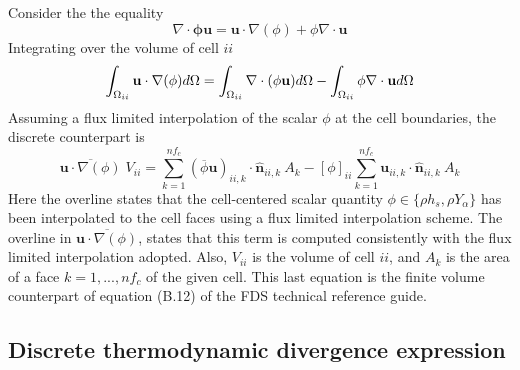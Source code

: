 Consider the the equality
%
\begin{equation}
    \nabla \cdot \mathbf{\phi u} = \mathbf{u} \cdot \nabla (\phi) + \phi \nabla \cdot \mathbf{u} \label{eq:advforms}
\end{equation}
%
Integrating over the volume of cell $ii$
%
\begin{equation}
    \int_{\Omega_{ii}} {\mathbf{u} \cdot \nabla(\phi)} d\Omega =
    \int_{\Omega_{ii}} \nabla \cdot ({\phi} \mathbf{u}) d\Omega -
    \int_{\Omega_{ii}} \phi \nabla \cdot \mathbf{u} d\Omega \label{eq:flxlim1} \\
\end{equation}
Assuming a flux limited interpolation of the scalar $\phi$ at the cell boundaries, the discrete counterpart is
%
\begin{equation}
    \overline{\mathbf{u} \cdot \nabla(\phi)} \; V_{ii} =
    \sum_{k=1}^{nf_c} (\overline{\phi} \mathbf{u})_{ii,k} \cdot \hat{\mathbf{n}}_{ii,k} \: A_k -
    [\phi]_{ii} \sum_{k=1}^{nf_c} \mathbf{u}_{ii,k} \cdot \hat{\mathbf{n}}_{ii,k} \: A_k \label{eq:flxlim2}
\end{equation}
%
Here the overline states that the cell-centered scalar quantity $\phi \in \{\rho h_s, \rho Y_\alpha\}$ has been interpolated to the cell faces using a flux limited interpolation scheme. The overline in $\overline{\mathbf{u} \cdot \nabla(\phi)}$, states that this term is computed consistently with the flux limited interpolation adopted. Also, $V_{ii}$ is the volume of cell $ii$, and $A_k$ is the area of a face $k=1,...,nf_c$ of the given cell. This last equation is the finite volume counterpart of equation (B.12) of the FDS technical reference guide.

\subsection{Discrete thermodynamic divergence expression}

